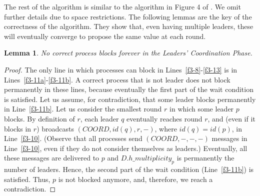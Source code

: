 \documentclass[10pt, conference, compsocconf]{IEEEtran}
\newtheorem{lemma}{Lemma}
\newcommand{\multiplicity}{{\mathit{h\_multiplicity}}}
\begin{document}
The  rest of  the algorithm  is similar  to the  algorithm in  Figure  4 of
\cite{DBLP:conf/aina/BonnetR10}.  We  omit  further  details due  to  space
restrictions. 
The following lemmas are the key  of the correctness of the algorithm. They
show that, even having multiple  leaders, these will eventually converge to
propose the same value at each round. 
 
\begin{lemma} 
\label{no-block}
No correct process blocks forever in the Leaders' Coordination Phase.
\end{lemma} 
\begin{proof}
The only line in  which processes can block in Lines~\ref{f3-8}-\ref{f3-13}
is in Lines~\ref{f3-11a}-\ref{f3-11b}. A correct process that is not leader
does not  block permanently  in these lines,  because eventually  the first
part of  
the wait  condition is  satisfied. Let us  assume, for  contradiction, that
some leader  blocks permanently in  Line~\ref{f3-11b}. Let us  consider the
smallest round $r$  in which some leader $p$ blocks.  By definition of $r$,
each leader  $q$ eventually reaches  round $r$, and  (even if it  blocks in
$r$)   broadcasts  $(COORD,   id(q),  r,   -)$,  where   $id(q)=id(p)$,  in
Line~\ref{f3-10}. (Observe that all processes send $(COORD,-,-,-)$ messages  
in Line~\ref{f3-10}, even  if they do not consider  themselves as leaders.)
Eventually, all these messages are delivered to $p$  
and $D.\multiplicity_p$  is permanently the  number of leaders.  Hence, the
second part  of the wait condition (Line~\ref{f3-11b})  is satisfied. Thus,
$p$ is not blocked anymore, and, therefore, we reach a contradiction. 
\end{proof}
\end{document}

